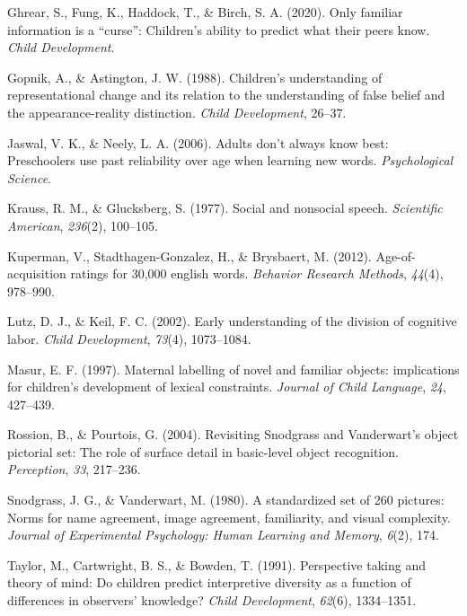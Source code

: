 \documentclass[10pt, letterpaper]{article}
\begin{document}
\leavevmode\hypertarget{ref-ghrear2020}{}%
Ghrear, S., Fung, K., Haddock, T., \& Birch, S. A. (2020). Only familiar
information is a ``curse'': Children's ability to predict what their
peers know. \emph{Child Development}.

\leavevmode\hypertarget{ref-gopnik1988}{}%
Gopnik, A., \& Astington, J. W. (1988). Children's understanding of
representational change and its relation to the understanding of false
belief and the appearance-reality distinction. \emph{Child Development},
26--37.

\leavevmode\hypertarget{ref-jaswal2006}{}%
Jaswal, V. K., \& Neely, L. A. (2006). Adults don't always know best:
Preschoolers use past reliability over age when learning new words.
\emph{Psychological Science}.

\leavevmode\hypertarget{ref-krauss1977}{}%
Krauss, R. M., \& Glucksberg, S. (1977). Social and nonsocial speech.
\emph{Scientific American}, \emph{236}(2), 100--105.

\leavevmode\hypertarget{ref-kuperman2012}{}%
Kuperman, V., Stadthagen-Gonzalez, H., \& Brysbaert, M. (2012).
Age-of-acquisition ratings for 30,000 english words. \emph{Behavior
Research Methods}, \emph{44}(4), 978--990.

\leavevmode\hypertarget{ref-lutz2002}{}%
Lutz, D. J., \& Keil, F. C. (2002). Early understanding of the division
of cognitive labor. \emph{Child Development}, \emph{73}(4), 1073--1084.

\leavevmode\hypertarget{ref-masur1997}{}%
Masur, E. F. (1997). Maternal labelling of novel and familiar objects:
implications for children's development of lexical constraints.
\emph{Journal of Child Language}, \emph{24}, 427--439.

\leavevmode\hypertarget{ref-rossion2004}{}%
Rossion, B., \& Pourtois, G. (2004). Revisiting Snodgrass and
Vanderwart's object pictorial set: The role of surface detail in
basic-level object recognition. \emph{Perception}, \emph{33}, 217--236.

\leavevmode\hypertarget{ref-snodgrass1980}{}%
Snodgrass, J. G., \& Vanderwart, M. (1980). A standardized set of 260
pictures: Norms for name agreement, image agreement, familiarity, and
visual complexity. \emph{Journal of Experimental Psychology: Human
Learning and Memory}, \emph{6}(2), 174.

\leavevmode\hypertarget{ref-taylor1991}{}%
Taylor, M., Cartwright, B. S., \& Bowden, T. (1991). Perspective taking
and theory of mind: Do children predict interpretive diversity as a
function of differences in observers' knowledge? \emph{Child
Development}, \emph{62}(6), 1334--1351.
\end{document}
